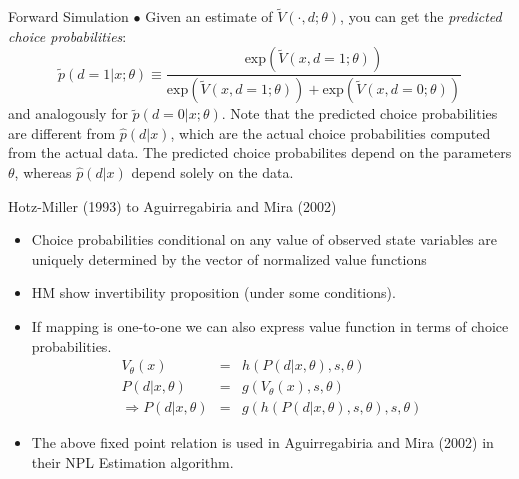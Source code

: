 \documentclass[xcolor=pdftex,dvipsnames,table,mathserif]{beamer}
\begin{document}
\begin{frame}{Forward Simulation}
$\bullet$ Given an estimate of $\tilde V (\cdot, d; \theta)$, you can get the \emph{predicted choice probabilities}: 
\begin{equation}
\tilde p (d =1 |x ; \theta) \equiv \frac {\text{exp} \left ( \tilde V (x, d=1; \theta) \right )}{\text{exp} \left ( \tilde V (x, d=1 ;\theta) \right ) + \text{exp} \left ( \tilde V (x, d= 0 ;\theta ) \right )}
\end{equation}
and analogously for $\tilde p (d = 0 |x ; \theta)$. Note that the predicted choice probabilities are different from $\hat p (d|x)$, which are the actual choice probabilities computed from the actual data. The predicted choice probabilites depend on the parameters $\theta$, whereas $\hat p (d|x)$ depend solely on the data. 
\end{frame}

\begin{frame}{Hotz-Miller (1993) to Aguirregabiria and Mira (2002)}
\begin{itemize}
\item Choice probabilities conditional on any value of observed state variables are uniquely determined by the vector of normalized value functions
\item HM show invertibility proposition (under some conditions).
\item If mapping is one-to-one we can also express value function in terms of choice probabilities. 
\begin{eqnarray*}
V_{\theta}(x) &=& h(P(d | x,\theta),s,\theta)\\
P(d | x,\theta) &=& g(V_{\theta}(x),s,\theta) \\
\Rightarrow P(d | x,\theta) &=& g(h(P(d | x, \theta),s ,\theta),s,\theta)
\end{eqnarray*}
\item The above fixed point relation is used in Aguirregabiria and Mira (2002) in their NPL Estimation algorithm.
\end{itemize}
\end{frame}
\end{document}
